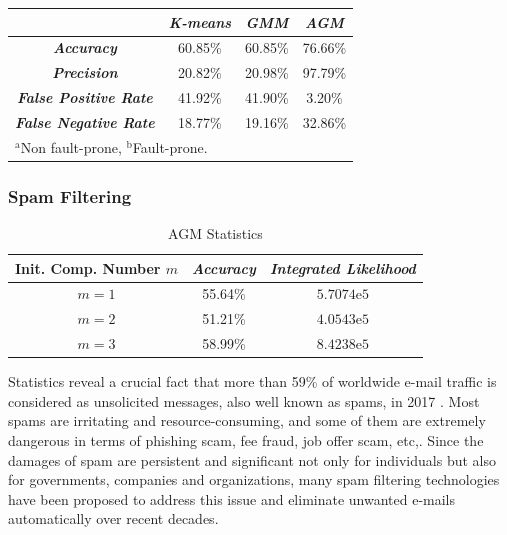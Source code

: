 \begin{table}
\begin{minipage}{.3\textwidth}
\end{minipage}  

    

\begin{tabular}{|c|c|c|c|}
\hline
& \multicolumn{1}{|p{2cm}|}{\centering \textbf{\textit{K-means}}} & \multicolumn{1}{|p{2cm}|}{\centering \textbf{\textit{GMM}}} & \multicolumn{1}{|p{2cm}|}{\centering \textbf{\textit{AGM}}}\\
\hline
\multicolumn{1}{|p{3.2cm}|}{\centering \textbf{\textit{Accuracy}}} & 60.85\% & 60.85\% & 76.66\%\\
\multicolumn{1}{|p{3.2cm}|}{\centering \textbf{\textit{Precision}}} & 20.82\% & 20.98\% & 97.79\%\\
\multicolumn{1}{|p{3.2cm}|}{\centering \textbf{\textit{False Positive Rate}}} & 41.92\% & 41.90\% & 3.20\%\\
\multicolumn{1}{|p{3.2cm}|}{\centering \textbf{\textit{False Negative Rate}}} & 18.77\% & 19.16\% & 32.86\%\\
\hline
\multicolumn{3}{l}{$^{\mathrm{a}}$Non fault-prone, $^{\mathrm{b}}$Fault-prone.}
\end{tabular}

\label{tab5}
\end{table}


\subsubsection{Spam Filtering}
\label{sec:2.5.3}

\begin{table}[b]
\caption{AGM Statistics}

\begin{tabular}{|c|c|c|}
\hline
\multicolumn{1}{|p{2cm}|}{\centering \textbf{Init. Comp. Number $m$}} & \multicolumn{1}{|p{2cm}|}{\centering \textbf{\textit{Accuracy}}} & \multicolumn{1}{|p{2cm}|}{\centering \textbf{\textit{Integrated Likelihood}}}\\
\hline
$m=1$ & 55.64\% & $5.7074\mathrm{e}{5}$\\
$m=2$ & 51.21\% & $4.0543\mathrm{e}{5}$ \\
$m=3$ & 58.99\% & $8.4238\mathrm{e}{5}$ \\
\hline
\end{tabular}
\label{tab6}

\end{table}

Statistics reveal a crucial fact that more than 59\% of worldwide e-mail traffic is considered as unsolicited messages, also well known as spams, in 2017 \cite{Lab2018}. Most spams are irritating and resource-consuming, and some of them are extremely dangerous in terms of phishing scam, fee fraud, job offer scam, etc,. Since the damages of spam are persistent and significant not only for individuals but also for governments, companies and organizations, many spam filtering technologies have been proposed to address this issue and eliminate unwanted e-mails automatically over recent decades. 

